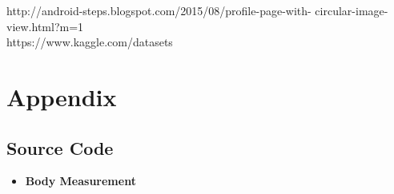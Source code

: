 \documentclass[a4paper,12pt,toc=flat]{report}
\begin{document}
{{\subitem[14]http://android-steps.blogspot.com/2015/08/profile-page-with-
circular-image-view.html?m=1\\
	\subitem	[15]https://www.kaggle.com/datasets\\
		
		

\pagebreak
 \section{Appendix}{
 	
 	
 	\subsection{Source Code}{
 		\begin{itemize}
 			\item {\bf Body Measurement}
 			\begin{verbatim}	
 				

\end{verbatim}
\end{itemize}}}}}
\end{document}
